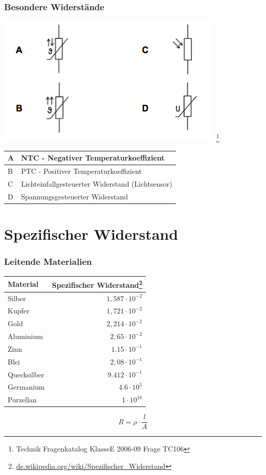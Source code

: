 \begin{frame}
    \frametitle{Besondere Widerstände}

    \begin{center}
        \includegraphics[width=.7\textwidth]{e04/bild-TC106.png}
        \footnote{\tiny Technik Fragenkatalog KlasseE 2006-09 Frage TC106}
 	
 	\begin{tabular}{l||l}\hline
        A & NTC - Negativer Temperaturkoeffizient \\ \hline
        B & PTC - Positiver Temperaturkoeffizient \\ \hline
        C & Lichteinfallgesteuerter Widerstand (Lichtsensor) \\ \hline
        D & Spannungsgesteuerter Widerstand \\ \hline
    \end{tabular}
 	    \end{center}
\end{frame}

\section*{Spezifischer Widerstand}

\begin{frame}
    \frametitle{Leitende Materialien}

     \begin{tabular}{lr}
  	Material & Spezifischer Widerstand\footnote{\tiny \url{de.wikipedia.org/wiki/Spezifischer_Widerstand}} \\ \hline
  	Silber & $1,587 \cdot 10^{-2}$ \\
  	Kupfer & $1,721 \cdot 10^{-2}$ \\
  	Gold & $2,214 \cdot 10^{-2}$ \\
  	Aluminium & $2,65 \cdot 10^{-2}$ \\
  	Zinn & $1.15 \cdot 10^{-1}$ \\
  	Blei & $2,08 \cdot 10^{-1}$ \\
  	Quecksilber & $9.412 \cdot 10^{-1}$ \\
  	Germanium & $4.6 \cdot 10^{5}$\\
  	Porzellan & $1 \cdot 10^{18}$ \\
 	\end{tabular}
 	
 	$$R = \rho \cdot \frac{l}{A}$$
 	

\end{frame}

